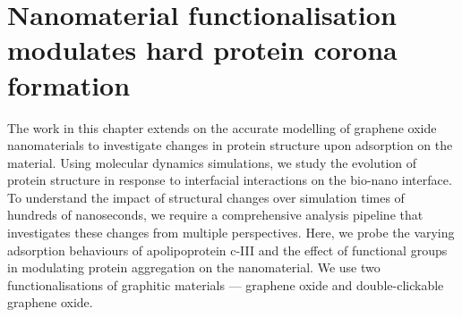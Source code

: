 \chapter{Nanomaterial functionalisation modulates hard protein corona formation} \label{ProteinCorona}



The work in this chapter extends on the accurate modelling of graphene oxide nanomaterials to investigate changes in protein structure upon adsorption on the material. Using molecular dynamics simulations, we study the evolution of protein structure in response to interfacial interactions on the bio-nano interface. To understand the impact of structural changes over simulation times of hundreds of nanoseconds, we require a comprehensive analysis pipeline that investigates these changes from multiple perspectives. Here, we probe the varying adsorption behaviours of apolipoprotein c-III and the effect of functional groups in modulating protein aggregation on the nanomaterial. We use two functionalisations of graphitic materials --- graphene oxide and double-clickable graphene oxide.

\clearpage

